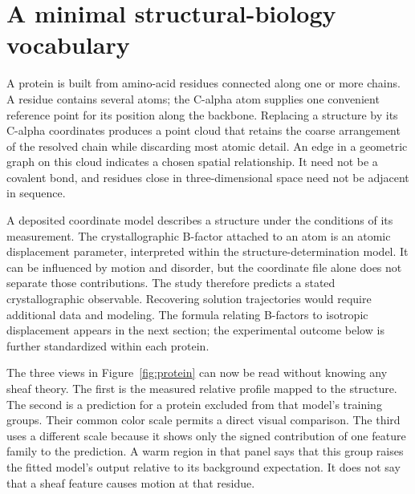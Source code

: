 \section{A minimal structural-biology vocabulary}
A protein is built from amino-acid residues connected along one or more chains. A residue contains several atoms; the C-alpha atom supplies one convenient reference point for its position along the backbone. Replacing a structure by its C-alpha coordinates produces a point cloud that retains the coarse arrangement of the resolved chain while discarding most atomic detail. An edge in a geometric graph on this cloud indicates a chosen spatial relationship. It need not be a covalent bond, and residues close in three-dimensional space need not be adjacent in sequence.

A deposited coordinate model describes a structure under the conditions of its measurement. The crystallographic B-factor attached to an atom is an atomic displacement parameter, interpreted within the structure-determination model. It can be influenced by motion and disorder, but the coordinate file alone does not separate those contributions. The study therefore predicts a stated crystallographic observable. Recovering solution trajectories would require additional data and modeling. The formula relating B-factors to isotropic displacement appears in the next section; the experimental outcome below is further standardized within each protein.

The three views in Figure~\ref{fig:protein} can now be read without knowing any sheaf theory. The first is the measured relative profile mapped to the structure. The second is a prediction for a protein excluded from that model's training groups. Their common color scale permits a direct visual comparison. The third uses a different scale because it shows only the signed contribution of one feature family to the prediction. A warm region in that panel says that this group raises the fitted model's output relative to its background expectation. It does not say that a sheaf feature causes motion at that residue.

